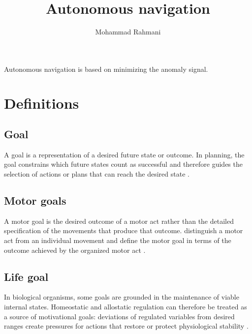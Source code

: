 \documentclass[a4paper]{article}
\title{Autonomous navigation}
\date{}
\author{Mohammad Rahmani}
\begin{document}
   \maketitle
   \label{autonomous_navigation}
   Autonomous navigation is based on minimizing the anomaly signal.

   \section{Definitions}
      \subsection{Goal}
         A goal is a representation of a desired future state or outcome. In planning, the goal constrains which future states count as successful and therefore guides the selection of actions or plans that can reach the desired state \cite{mcdermott-1999-using-regression-match-graphs-to-control-search-in-planning}.

      \subsection{Motor goals}
         A motor goal is the desired outcome of a motor act rather than the detailed specification of the movements that produce that outcome. \cite{rizzolatti-2014-the-mirror-mechanism-recent-findings-and-perspectives} distinguish a motor act from an individual movement and define the motor goal in terms of the outcome achieved by the organized motor act .

      \subsection{Life goal}
         In biological organisms, some goals are grounded in the maintenance of viable internal states. Homeostatic and allostatic regulation can therefore be treated as a source of motivational goals: deviations of regulated variables from desired ranges create pressures for actions that restore or protect physiological stability \cite{keramati-2014-homeostatic-reinforcement-learning}.
\end{document}

